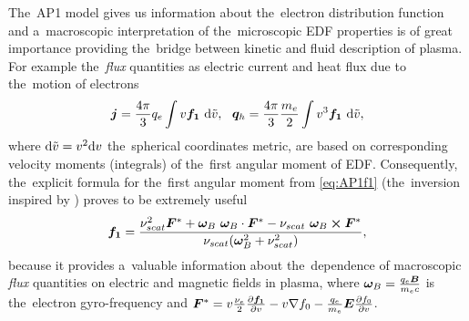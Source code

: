 The~AP1 model gives us information about the~electron distribution function and
a~macroscopic interpretation of the~microscopic EDF properties is of great
importance providing the~bridge between kinetic and fluid description of 
plasma. For example the~\textit{flux} quantities as 
electric current and heat flux due to the~motion of electrons
\begin{equation}
  \boldsymbol{j} = \frac{4\pi}{3}q_e \int v {\boldsymbol{f_1}}~\text{d}\tilde{v},~~ 
  \boldsymbol{q}_h = \frac{4\pi}{3}\frac{m_e}{2} \int v^3 {\boldsymbol{f_1}}~\text{d}\tilde{v},
  \nonumber
\end{equation}
where $\text{d}\tilde{v} = v^2\text{d}v$ 
the~spherical coordinates metric,
are based on corresponding velocity moments (integrals) of the~first angular 
moment of EDF. Consequently, the~explicit formula for the~first angular moment
from \eqref{eq:AP1f1} (the~inversion inspired by \cite{Shkarofsky_1979_73})
proves to be extremely useful
\begin{equation}
  {\boldsymbol{f_1}} = \frac{\nu_{scat}^2 \boldsymbol{F}^* + \boldsymbol{\omega}_{B}~\boldsymbol{\omega}_{B}\cdot\boldsymbol{F}^* 
  - \nu_{scat}~\boldsymbol{\omega}_{B} \boldsymbol{\times} \boldsymbol{F}^*}{\nu_{scat} (\boldsymbol{\omega}_{B}^2 + \nu_{scat}^2)}
  ,
  \label{eq:f1_explicit}
\end{equation} 
because it provides a~valuable 
information about the~dependence of macroscopic \textit{flux} quantities on
electric and magnetic fields in plasma, 
where $\boldsymbol{\omega}_{B} = \frac{q_e\boldsymbol{B}}{m_e c}$ is the~electron gyro-frequency and 
$\boldsymbol{F}^* = v\frac{\nu_{e}}{2}\frac{\partial{{\boldsymbol{f_1}}}}{\partial{v}} - v\nabla f_0 
 - \frac{q_e}{m_e}\boldsymbol{E}\frac{\partial{f_0}}{\partial{v}}$.

